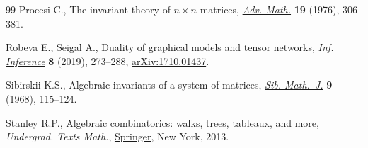 \documentclass[10pt,a4paper]{amsart}
\numberwithin{equation}{section}
\begin{document}
\begin{thebibliography}{99}
Procesi C., The invariant theory of {$n\times n$} matrices, \href{https://doi.org/10.1016/0001-8708(76)90027-X}{\textit{Adv. Math.}}
  \textbf{19} (1976), 306--381.

Robeva E., Seigal A., Duality of graphical models and tensor networks,
  \href{https://doi.org/10.1093/imaiai/iay009}{\textit{Inf. Inference}} \textbf{8} (2019), 273--288, \href{https://arxiv.org/abs/1710.01437}{arXiv:1710.01437}.

Sibirskii K.S., Algebraic invariants of a system of matrices, \href{https://doi.org/10.1007/BF02196663}{\textit{Sib.
  Math.~J.}} \textbf{9} (1968), 115--124.

Stanley R.P., Algebraic combinatorics: walks, trees, tableaux, and more,
  \textit{Undergrad. Texts Math.}, \href{https://doi.org/10.1007/978-1-4614-6998-8}{Springer}, New York, 2013.

\end{thebibliography}
\end{document}
